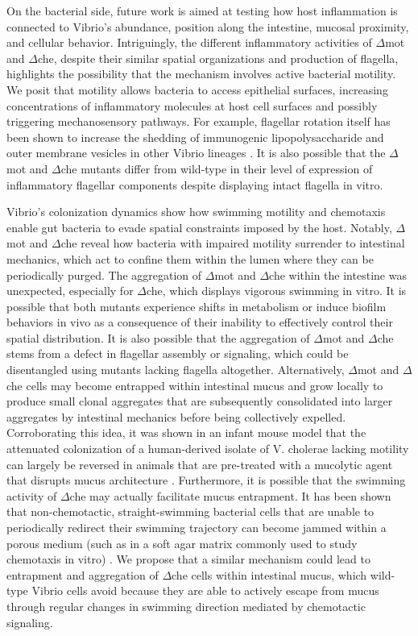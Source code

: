 On the bacterial side, future work is aimed at testing how host inflammation is connected to Vibrio's abundance, position along the intestine, mucosal proximity, and cellular behavior. Intriguingly, the different inflammatory activities of $\Delta$mot and $\Delta$che, despite their similar spatial organizations and production of flagella, highlights the possibility that the mechanism involves active bacterial motility. We posit that motility allows bacteria to access epithelial surfaces, increasing concentrations of inflammatory molecules at host cell surfaces and possibly triggering mechanosensory pathways. For example, flagellar rotation itself has been shown to increase the shedding of immunogenic lipopolysaccharide and outer membrane vesicles in other Vibrio lineages \cite{brennan_model_2014,aschtgen_rotation_2016}. It is also possible that the $\Delta$mot and $\Delta$che mutants differ from wild-type in their level of expression of inflammatory flagellar components despite displaying intact flagella in vitro. 

Vibrio's colonization dynamics show how swimming motility and chemotaxis enable gut bacteria to evade spatial constraints imposed by the host. Notably, $\Delta$mot and $\Delta$che reveal how bacteria with impaired motility surrender to intestinal mechanics, which act to confine them within the lumen where they can be periodically purged. The aggregation of $\Delta$mot and $\Delta$che within the intestine was unexpected, especially for $\Delta$che, which displays vigorous swimming in vitro. It is possible that both mutants experience shifts in metabolism or induce biofilm behaviors in vivo as a consequence of their inability to effectively control their spatial distribution. It is also possible that the aggregation of $\Delta$mot and $\Delta$che stems from a defect in flagellar assembly or signaling, which could be disentangled using mutants lacking flagella altogether. Alternatively, $\Delta$mot and $\Delta$che cells may become entrapped within intestinal mucus and grow locally to produce small clonal aggregates that are subsequently consolidated into larger aggregates by intestinal mechanics before being collectively expelled. Corroborating this idea, it was shown in an infant mouse model that the attenuated colonization of a human-derived isolate of V. cholerae lacking motility can largely be reversed in animals that are pre-treated with a mucolytic agent that disrupts mucus architecture \cite{millet_insights_2014}. Furthermore, it is possible that the swimming activity of $\Delta$che may actually facilitate mucus entrapment. It has been shown that non-chemotactic, straight-swimming bacterial cells that are unable to periodically redirect their swimming trajectory can become jammed within a porous medium (such as in a soft agar matrix commonly used to study chemotaxis in vitro) \cite{licata_diffusion_2016}. We propose that a similar mechanism could lead to entrapment and aggregation of $\Delta$che cells within intestinal mucus, which wild-type Vibrio cells avoid because they are able to actively escape from mucus through regular changes in swimming direction mediated by chemotactic signaling.

